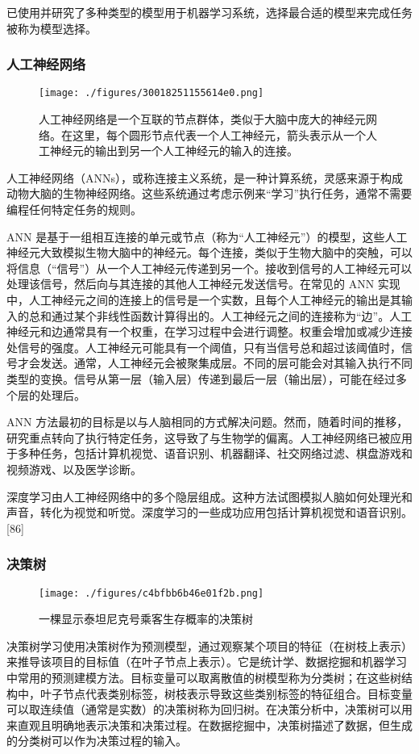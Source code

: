 已使用并研究了多种类型的模型用于机器学习系统，选择最合适的模型来完成任务被称为模型选择。
\subsubsection{人工神经网络}
\begin{figure}[ht]
\centering
\texttt{[image: ./figures/30018251155614e0.png]}
\caption{人工神经网络是一个互联的节点群体，类似于大脑中庞大的神经元网络。在这里，每个圆形节点代表一个人工神经元，箭头表示从一个人工神经元的输出到另一个人工神经元的输入的连接。} \label{fig_JQXX_5}
\end{figure}
人工神经网络（ANNs），或称连接主义系统，是一种计算系统，灵感来源于构成动物大脑的生物神经网络。这些系统通过考虑示例来“学习”执行任务，通常不需要编程任何特定任务的规则。

ANN 是基于一组相互连接的单元或节点（称为“人工神经元”）的模型，这些人工神经元大致模拟生物大脑中的神经元。每个连接，类似于生物大脑中的突触，可以将信息（“信号”）从一个人工神经元传递到另一个。接收到信号的人工神经元可以处理该信号，然后向与其连接的其他人工神经元发送信号。在常见的 ANN 实现中，人工神经元之间的连接上的信号是一个实数，且每个人工神经元的输出是其输入的总和通过某个非线性函数计算得出的。人工神经元之间的连接称为“边”。人工神经元和边通常具有一个权重，在学习过程中会进行调整。权重会增加或减少连接处信号的强度。人工神经元可能具有一个阈值，只有当信号总和超过该阈值时，信号才会发送。通常，人工神经元会被聚集成层。不同的层可能会对其输入执行不同类型的变换。信号从第一层（输入层）传递到最后一层（输出层），可能在经过多个层的处理后。

ANN 方法最初的目标是以与人脑相同的方式解决问题。然而，随着时间的推移，研究重点转向了执行特定任务，这导致了与生物学的偏离。人工神经网络已被应用于多种任务，包括计算机视觉、语音识别、机器翻译、社交网络过滤、棋盘游戏和视频游戏、以及医学诊断。

深度学习由人工神经网络中的多个隐层组成。这种方法试图模拟人脑如何处理光和声音，转化为视觉和听觉。深度学习的一些成功应用包括计算机视觉和语音识别。[86]
\subsubsection{决策树}
\begin{figure}[ht]
\centering
\texttt{[image: ./figures/c4bfbb6b46e01f2b.png]}
\caption{一棵显示泰坦尼克号乘客生存概率的决策树} \label{fig_JQXX_6}
\end{figure}
决策树学习使用决策树作为预测模型，通过观察某个项目的特征（在树枝上表示）来推导该项目的目标值（在叶子节点上表示）。它是统计学、数据挖掘和机器学习中常用的预测建模方法。目标变量可以取离散值的树模型称为分类树；在这些树结构中，叶子节点代表类别标签，树枝表示导致这些类别标签的特征组合。目标变量可以取连续值（通常是实数）的决策树称为回归树。在决策分析中，决策树可以用来直观且明确地表示决策和决策过程。在数据挖掘中，决策树描述了数据，但生成的分类树可以作为决策过程的输入。
